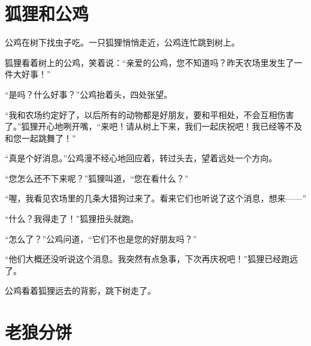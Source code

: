 \documentclass[12pt,UTF-8,openany]{ctexbook}
\begin{document}
\chapter{狐狸和公鸡}

\begin{large}
    
    公鸡在树下找虫子吃。一只狐狸悄悄走近，公鸡连忙跳到树上。
    
    狐狸看着树上的公鸡，笑着说：“亲爱的公鸡，您不知道吗？昨天农场里发生了一件大好事！”
    
    “是吗？什么好事？”公鸡抬着头，四处张望。
    
    “我和农场约定好了，以后所有的动物都是好朋友，要和平相处，不会互相伤害了。”狐狸开心地咧开嘴，“来吧！请从树上下来，我们一起庆祝吧！我已经等不及和您一起跳舞了！”
    
    “真是个好消息。”公鸡漫不经心地回应着，转过头去，望着远处一个方向。
    
    “您怎么还不下来呢？”狐狸叫道，“您在看什么？”
    
    “喔，我看见农场里的几条大猎狗过来了。看来它们也听说了这个消息，想来——”
    
    “什么？我得走了！”狐狸扭头就跑。
    
    “怎么了？”公鸡问道，“它们不也是您的好朋友吗？”
    
    “他们大概还没听说这个消息。我突然有点急事，下次再庆祝吧！”狐狸已经跑远了。
    
    公鸡看着狐狸远去的背影，跳下树走了。
    
\end{large}



\chapter{老狼分饼}
\end{document}
